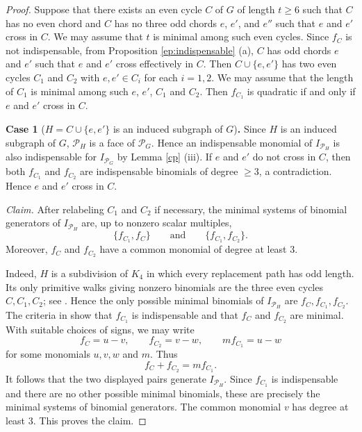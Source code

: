 \documentclass[10pt,a4paper]{amsart}
\numberwithin{thm}{section}
\numberwithin{equation}{section}
\begin{document}
\begin{proof}
Suppose that there exists an even cycle $C$ of $G$ of length $t \ge 6$ such that
    $C$ has no even chord and $C$ has no three odd chords $e$, $e'$, and $e''$ such that $e $ and $e'$ cross in $C$.
    We may assume that $t$ is minimal among such even cycles.
    Since $f_C$ is not indispensable, from Proposition \ref{ep:indispensable} (a), $C$ has odd chords $e$ and $e'$ such that $e $ and $e'$ cross effectively in $C$.
    Then $C \cup \{e,e'\}$ has two even cycles $C_1$ and $C_2$ with $e, e' \in C_i$ for each $i=1,2$.
    We may assume that the length of $C_1$ is minimal among such $e$, $e'$, $C_1$ and $C_2$.  
    Then $f_{C_1}$ is quadratic if and only if $e$ and $e'$ cross in $C$.

\bigskip

\noindent
{\bf Case 1} ($H=C \cup \{e,e'\}$ is an induced subgraph of $G$){\bf .}
Since \(H\) is an induced subgraph of \(G\), \(\mathcal{P}_H\) is a face of \(\mathcal{P}_G\).
Hence an indispensable monomial of \(I_{\mathcal{P}_H}\) is also indispensable for
\(I_{\mathcal{P}_G}\) by Lemma \ref{cp} (iii).
    If $e$ and $e'$ do not cross in $C$, then both $f_{C_1}$ and $f_{C_2}$ are indispensable binomials of degree $\ge 3$, a contradiction.
    Hence $e$ and $e'$ cross in $C$.

\medskip \noindent \emph{Claim.} After relabeling \(C_1\) and \(C_2\) if necessary, the minimal systems of binomial generators of \(I_{\mathcal P_H}\) are, up to nonzero scalar multiples, \[ \{f_{C_1},f_C\} \qquad\text{and}\qquad \{f_{C_1},f_{C_2}\}. \] Moreover, \(f_C\) and \(f_{C_2}\) have a common monomial of degree at least \(3\). 

\medskip

Indeed, \(H\) is a subdivision of \(K_4\) in which every replacement path has odd length. Its only primitive walks giving nonzero binomials are the three even cycles \(C,C_1,C_2\); see \cite[Theorem~3.1]{RTT}. Hence the only possible minimal binomials of \(I_{\mathcal P_H}\) are \(f_C,f_{C_1},f_{C_2}\). The criteria in \cite[Theorems~4.13 and 4.14 and Proposition~4.10]{RTT} show that \(f_{C_1}\) is indispensable and that \(f_C\) and \(f_{C_2}\) are minimal. With suitable choices of signs, we may write \[ f_C=u-v,\qquad f_{C_2}=v-w,\qquad m f_{C_1}=u-w \] for some monomials \(u,v,w\) and \(m\). Thus \[ f_C+f_{C_2}=m f_{C_1}. \] It follows that the two displayed pairs generate \(I_{\mathcal P_H}\). Since \(f_{C_1}\) is indispensable and there are no other possible minimal binomials, these are precisely the minimal systems of binomial generators. The common monomial \(v\) has degree at least \(3\). This proves the claim. 


\end{proof}
\end{document}
